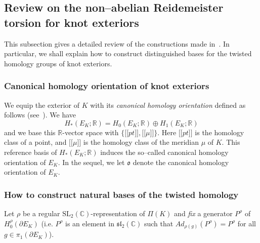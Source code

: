 \documentclass[a4paper]{amsart}
\theoremstyle{plain}
\newtheorem{proposition}[theorem]{Proposition}%
\theoremstyle{definition}
\theoremstyle{remark}
\newcommand{\C}{{\mathbb C}}
\newcommand{\CC}{{\mathbb C}}
\newcommand{\IR}{{\mathbb R}}
\newcommand{\bord}{\partial}
\newcommand{\SL}{{\mathrm{SL}_2(\C)}}
\newcommand{\sll}{\mathfrak{sl}_2(\CC)}
\begin{document}


\subsection{Review on the non--abelian Reidemeister torsion for knot exteriors}
\label{Torsion}
This subsection gives a detailed review of the constructions made in~\cite[Section~6]{JDFourier}. In particular, we shall explain how to construct distinguished bases for the twisted homology groups of knot exteriors. 

\subsubsection*{Canonical homology orientation of knot exteriors}
We equip the exterior of $K$ with its \emph{canonical homology orientation} defined as follows (see~\cite[Section V.3]{Turaev:2002}). We have 
$$H_*(E_K; \IR) = H_0(E_K; \IR) \oplus H_1(E_K; \IR)$$ 
and we base this $\IR$-vector space with $\{ \lbrack \! \lbrack pt \rbrack \! \rbrack, \lbrack \! \lbrack \mu \rbrack \! \rbrack\}$. Here $\lbrack \! \lbrack pt \rbrack \! \rbrack$ is the homology class of a point, and $\lbrack \! \lbrack \mu \rbrack \! \rbrack$ is the homology class of the meridian $\mu$ of $K$. This reference basis of $H_*(E_K; \IR)$ induces the so--called canonical homology orientation of $E_K$. In the sequel, we let $\mathfrak{o}$ denote the canonical homology orientation of $E_K$.

\subsubsection*{How to construct natural bases of the twisted homology}

Let $\rho$ be a regular $\SL$-representation of $\Pi(K)$ and {\emph{fix}} a generator $P^\rho$ of $H_0^\rho(\bord E_K)$ (i.e. $P^\rho$ is an element in $\sll$ such that $Ad_{\rho(g)}(P^\rho) = P^\rho$ for all $g \in \pi_1(\bord E_K)$).  
\end{document}
